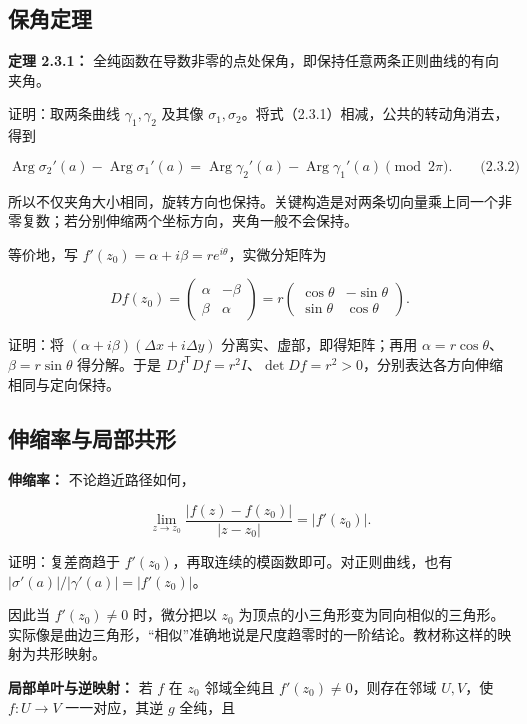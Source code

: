 \documentclass[11pt,a4paper]{article}
\begin{document}
\subsection{保角定理}\label{ch02-s3-ux4fddux89d2ux5b9aux7406}

\textbf{定理 2.3.1：}
全纯函数在导数非零的点处保角，即保持任意两条正则曲线的有向夹角。

证明：取两条曲线 \(\gamma_1,\gamma_2\) 及其像
\(\sigma_1,\sigma_2\)。将式（2.3.1）相减，公共的转动角消去，得到

\[
\operatorname{Arg}\sigma_2'(a)-\operatorname{Arg}\sigma_1'(a)
=\operatorname{Arg}\gamma_2'(a)-\operatorname{Arg}\gamma_1'(a)\pmod{2\pi}.
\qquad\text{(2.3.2)}
\]

所以不仅夹角大小相同，旋转方向也保持。关键构造是对两条切向量乘上同一个非零复数；若分别伸缩两个坐标方向，夹角一般不会保持。

等价地，写 \(f'(z_0)=\alpha+i\beta=re^{i\theta}\)，实微分矩阵为

\[
Df(z_0)=\begin{pmatrix}\alpha&-\beta\\\beta&\alpha\end{pmatrix}
=r\begin{pmatrix}\cos\theta&-\sin\theta\\\sin\theta&\cos\theta\end{pmatrix}.
\]

证明：将 \((\alpha+i\beta)(\Delta x+i\Delta y)\)
分离实、虚部，即得矩阵；再用
\(\alpha=r\cos\theta\)、\(\beta=r\sin\theta\) 得分解。于是
\(Df^{\mathsf T}Df=r^2I\)、\(\det Df=r^2>0\)，分别表达各方向伸缩相同与定向保持。

\subsection{伸缩率与局部共形}\label{ch02-s3-ux4f38ux7f29ux7387ux4e0eux5c40ux90e8ux5171ux5f62}

\textbf{伸缩率：} 不论趋近路径如何，

\[
\lim_{z\to z_0}\frac{|f(z)-f(z_0)|}{|z-z_0|}=|f'(z_0)|.
\]

证明：复差商趋于 \(f'(z_0)\)，再取连续的模函数即可。对正则曲线，也有
\(|\sigma'(a)|/|\gamma'(a)|=|f'(z_0)|\)。

因此当 \(f'(z_0)\ne0\) 时，微分把以 \(z_0\)
为顶点的小三角形变为同向相似的三角形。实际像是曲边三角形，``相似''准确地说是尺度趋零时的一阶结论。教材称这样的映射为共形映射。

\textbf{局部单叶与逆映射：} 若 \(f\) 在 \(z_0\) 邻域全纯且
\(f'(z_0)\ne0\)，则存在邻域 \(U,V\)，使 \(f:U\to V\) 一一对应，其逆
\(g\) 全纯，且
\end{document}
